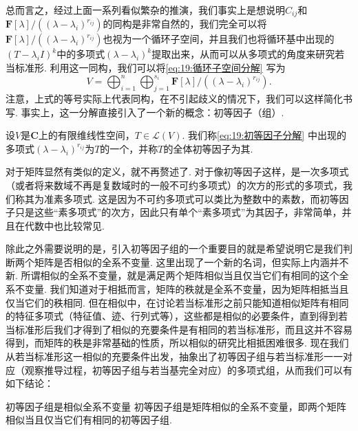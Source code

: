 总而言之，经过上面一系列看似繁杂的推演，我们事实上是想说明$C_{ij}$和$\mathbf{F}[\lambda]/((\lambda-\lambda_i)^{r_{ij}})$的同构是非常自然的，我们完全可以将$\mathbf{F}[\lambda]/((\lambda-\lambda_i)^{r_{ij}})$也视为一个循环子空间，并且我们也将循环基中出现的$(T-\lambda_i I)^k$中的多项式$(\lambda-\lambda_i)^k$提取出来，从而可以从多项式的角度来研究若当标准形. 利用这一同构，我们可以将\autoref{eq:19:循环子空间分解} 写为
\begin{equation} \label{eq:19:初等因子分解}
    V=\bigoplus_{i=1}^n\bigoplus_{j=1}^{s_i} \mathbf{F}[\lambda]/((\lambda-\lambda_i)^{r_{ij}}).
\end{equation}
注意，上式的等号实际上代表同构，在不引起歧义的情况下，我们可以这样简化书写. 事实上，这一分解直接引入了一个新的概念：初等因子（组）.
\begin{definition}{}{}
    设$V$是$\mathbf{C}$上的有限维线性空间，$T\in\mathcal{L}(V)$. 我们称\autoref{eq:19:初等因子分解} 中出现的多项式$(\lambda-\lambda_i)^{r_{ij}}$为$T$的一个，并称$T$的全体初等因子为其.
\end{definition}

对于矩阵显然有类似的定义，就不再赘述了. 对于像初等因子这样，是一次多项式（或者将来数域不再是复数域时的一般不可约多项式）的次方的形式的多项式，我们称其为准素多项式. 这是因为不可约多项式可以类比为整数中的素数，而初等因子只是这些``素多项式''的次方，因此只有单个``素多项式''为其因子，非常简单，并且在代数中也比较常见.

除此之外需要说明的是，引入初等因子组的一个重要目的就是希望说明它是我们判断两个矩阵是否相似的全系不变量. 这里出现了一个新的名词，但实际上内涵并不新. 所谓相似的全系不变量，就是满足两个矩阵相似当且仅当它们有相同的这个全系不变量. 我们知道对于相抵而言，矩阵的秩就是全系不变量，因为矩阵相抵当且仅当它们的秩相同. 但在相似中，在讨论若当标准形之前只能知道相似矩阵有相同的特征多项式（特征值、迹、行列式等），这些都是相似的必要条件，直到得到若当标准形后我们才得到了相似的充要条件是有相同的若当标准形，而且这并不容易得到，而矩阵的秩是非常基础的性质，所以相似的研究比相抵困难很多. 现在我们从若当标准形这一相似的充要条件出发，抽象出了初等因子组与若当标准形一一对应（观察推导过程，初等因子组与若当基完全对应）的多项式组，从而我们可以有如下结论：

\begin{theorem}{}{初等因子组是相似全系不变量}
    初等因子组是矩阵相似的全系不变量，即两个矩阵相似当且仅当它们有相同的初等因子组.
\end{theorem}

